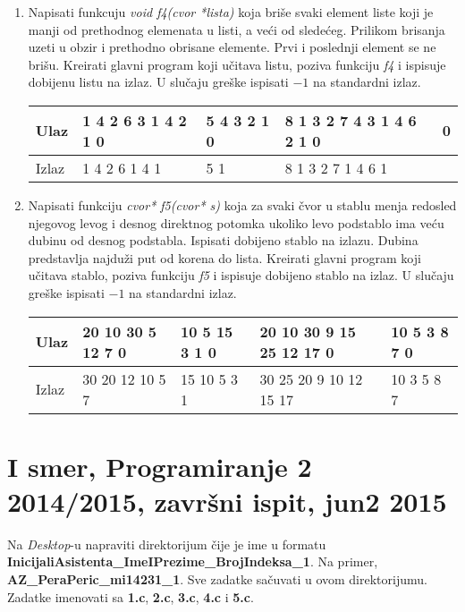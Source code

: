 \begin{enumerate}
\item Napisati funkcuju \emph{void f4(cvor *lista)} koja bri\v se svaki element liste koji je manji od prethodnog elemenata u listi, a ve\' ci od slede\' ceg. Prilikom brisanja uzeti u obzir i prethodno obrisane elemente. Prvi i poslednji element se ne bri\v su. Kreirati glavni program koji u\v citava listu, poziva funkciju \emph{f4} i ispisuje dobijenu listu na izlaz. U slu\v caju gre\v ske ispisati $-1$ na standardni izlaz.

\small
\begin{tabular}{ |l|l|l|l|l| }
\hline
  Ulaz &
  1 4 2 6 3 1 4 2 1 0&
  5 4 3 2 1 0&
 8 1 3 2 7 4 3 1 4 6 2 1 0&
  0\\ \hline
  Izlaz &
  1 4 2 6 1 4 1&
  5 1&
  8 1 3 2 7 1 4 6 1&
  \\ \hline
\end{tabular}
\normalsize

\item Napisati funkciju \emph{cvor* f5(cvor* s)} koja za svaki \v cvor u stablu menja redosled njegovog levog i desnog direktnog potomka ukoliko levo podstablo ima ve\' cu dubinu od desnog podstabla. Ispisati dobijeno stablo na izlazu. Dubina predstavlja najdu\v zi put od korena do lista. Kreirati glavni program koji u\v citava stablo, poziva funkciju \emph{f5} i ispisuje dobijeno stablo na izlaz. U slu\v caju gre\v ske ispisati $-1$ na standardni izlaz.

\small
\begin{tabular}{ |l|l|l|l|l| }
\hline
  Ulaz &
  20 10 30 5 12 7 0&
  10 5 15 3 1 0&
  20 10 30 9 15 25 12 17 0&
  10 5 3 8 7 0\\ \hline
  Izlaz &
  30 20 12 10 5 7&
  15 10 5 3 1&
  30 25 20 9 10 12 15 17&
  10 3 5 8 7\\ \hline
\end{tabular}
\normalsize

\end{enumerate}


\section{I smer, Programiranje 2 2014/2015, zavr\v{s}ni ispit, jun2 2015}

Na \textit{Desktop}-u napraviti direktorijum \v cije je ime u formatu \textbf{InicijaliAsistenta\_ImeIPrezime\_BrojIndeksa\_1}. Na primer, \textbf{AZ\_PeraPeric\_mi14231\_1}. Sve zadatke sa\v cuvati u ovom direktorijumu. Zadatke imenovati sa \textbf{1.c}, \textbf{2.c}, \textbf{3.c}, \textbf{4.c} i \textbf{5.c}.

